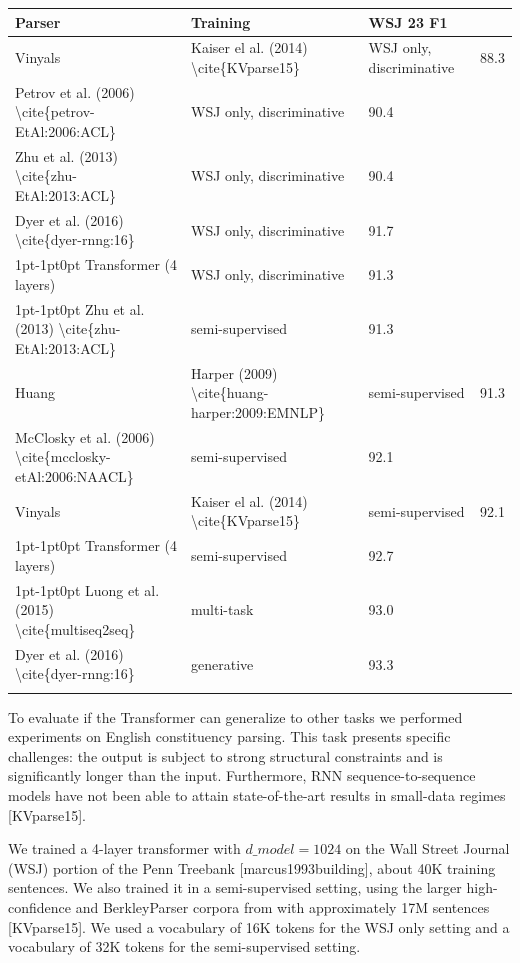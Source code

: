 \documentclass[11pt,a4paper]{article}
\begin{document}
\begin{table}[h]
\begin{tabular}{|l|l|l|l|}
\hline
Parser & Training & WSJ 23 F1 &  \\ \hline
Vinyals & Kaiser el al. (2014) \textbackslash{}cite\{KVparse15\} & WSJ only, discriminative & 88.3 \\ \hline
Petrov et al. (2006) \textbackslash{}cite\{petrov-EtAl:2006:ACL\} & WSJ only, discriminative & 90.4 &  \\ \hline
Zhu et al. (2013) \textbackslash{}cite\{zhu-EtAl:2013:ACL\} & WSJ only, discriminative & 90.4 &  \\ \hline
Dyer et al. (2016) \textbackslash{}cite\{dyer-rnng:16\} & WSJ only, discriminative & 91.7 &  \\ \hline
1pt-1pt0pt Transformer (4 layers) & WSJ only, discriminative & 91.3 &  \\ \hline
1pt-1pt0pt  Zhu et al. (2013) \textbackslash{}cite\{zhu-EtAl:2013:ACL\} & semi-supervised & 91.3 &  \\ \hline
Huang & Harper (2009) \textbackslash{}cite\{huang-harper:2009:EMNLP\} & semi-supervised & 91.3 \\ \hline
McClosky et al. (2006) \textbackslash{}cite\{mcclosky-etAl:2006:NAACL\} & semi-supervised & 92.1 &  \\ \hline
Vinyals & Kaiser el al. (2014) \textbackslash{}cite\{KVparse15\} & semi-supervised & 92.1 \\ \hline
1pt-1pt0pt Transformer (4 layers) & semi-supervised & 92.7 &  \\ \hline
1pt-1pt0pt  Luong et al. (2015) \textbackslash{}cite\{multiseq2seq\} & multi-task & 93.0 &  \\ \hline
Dyer et al. (2016) \textbackslash{}cite\{dyer-rnng:16\} & generative & 93.3 &  \\ \hline
 &  &  &  \\ \hline
\end{tabular}
\end{table}

To evaluate if the Transformer can generalize to other tasks we performed experiments on English constituency parsing. This task presents specific challenges: the output is subject to strong structural constraints and is significantly longer than the input.
Furthermore, RNN sequence-to-sequence models have not been able to attain state-of-the-art results in small-data regimes [KVparse15].

We trained a 4-layer transformer with $d\_{model} = 1024$ on the Wall Street Journal (WSJ) portion of the Penn Treebank [marcus1993building], about 40K training sentences. We also trained it in a semi-supervised setting, using the larger high-confidence and BerkleyParser corpora from with approximately 17M sentences [KVparse15]. We used a vocabulary of 16K tokens for the WSJ only setting and a vocabulary of 32K tokens for the semi-supervised setting.
\end{document}
